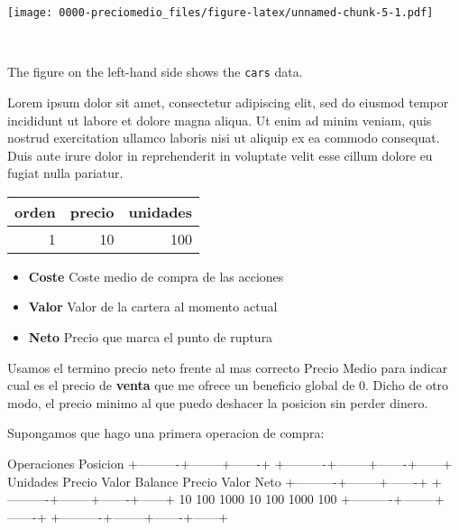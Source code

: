 \documentclass[
  twocolumn]{article}
\providecommand{\tightlist}{%
  \setlength{\itemsep}{0pt}\setlength{\parskip}{0pt}}
\begin{document}
\begin{cols}

\begin{col}{0.55\textwidth}
\texttt{[image: 0000-preciomedio\_files/figure-latex/unnamed-chunk-5-1.pdf]}

\end{col}

\begin{col}{0.05\textwidth}
~

\end{col}

\begin{col}{0.4\textwidth}
The figure on the left-hand side shows the \texttt{cars} data.

Lorem ipsum dolor sit amet, consectetur adipiscing elit, sed do eiusmod
tempor incididunt ut labore et dolore magna aliqua. Ut enim ad minim
veniam, quis nostrud exercitation ullamco laboris nisi ut aliquip ex ea
commodo consequat. Duis aute irure dolor in reprehenderit in voluptate
velit esse cillum dolore eu fugiat nulla pariatur.

\end{col}


\end{cols}

\begin{longtable}[]{@{}rrr@{}}
\toprule
orden & precio & unidades\tabularnewline
\midrule
\endhead
1 & 10 & 100\tabularnewline
\bottomrule
\end{longtable}

\begin{itemize}
\tightlist
\item
  \textbf{Coste} Coste medio de compra de las acciones
\item
  \textbf{Valor} Valor de la cartera al momento actual
\item
  \textbf{Neto} Precio que marca el punto de ruptura
\end{itemize}

Usamos el termino precio neto frente al mas correcto Precio Medio para
indicar cual es el precio de \textbf{venta} que me ofrece un beneficio
global de 0. Dicho de otro modo, el precio minimo al que puedo deshacer
la posicion sin perder dinero.

Supongamos que hago una primera operacion de compra:

Operaciones Posicion +----------+--------+-------+
+----------+--------+-------+------+\\
\textbar{} Unidades \textbar{} Precio \textbar{} Valor \textbar{}
\textbar{} Balance \textbar{} Precio \textbar{} Valor \textbar{} Neto
\textbar{} +----------+--------+-------+
+----------+--------+-------+------+ \textbar{} 10 \textbar{} 100
\textbar{} 1000 \textbar{} \textbar{} 10 \textbar{} 100 \textbar{} 1000
\textbar{} 100 \textbar{} +----------+--------+-------+
+----------+--------+-------+------+
\end{document}
